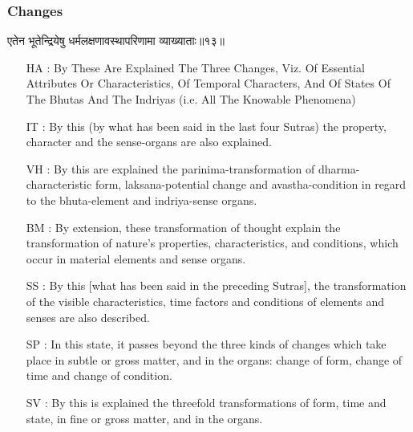 \begin{frame}[fragile]\frametitle{Changes}
\begin{sanskrit}
एतेन भूतेन्द्रियेषु धर्मलक्षणावस्थापरिणामा व्याख्याताः॥१३॥
\end{sanskrit}

	\begin{itemize}
	\item [HA]: By These Are Explained The Three Changes, Viz. Of Essential Attributes Or Characteristics, Of Temporal Characters, And Of States Of The Bhutas And The Indriyas (i.e. All The Knowable Phenomena)
	\item [IT]: By this (by what has been said in the last four Sutras) the property, character and the sense-organs are also explained.
	\item [VH]: By this are explained the parinima-transformation of dharma-characteristic form, laksana-potential change and avastha-condition in regard to the bhuta-element and indriya-sense organs.
	\item [BM]: By extension, these transformation of thought explain the transformation of nature’s properties, characteristics, and conditions, which occur in material elements and sense organs.
	\item [SS]: By this [what has been said in the preceding Sutras], the transformation of the visible characteristics, time factors and conditions of elements and senses are also described.
	\item [SP]: In this state, it passes beyond the three kinds of changes which take place in subtle or gross matter, and in the organs: change of form, change of time and change of condition.
	\item [SV]: By this is explained the threefold transformations of form, time and state, in fine or gross matter, and in the organs. 
	\end{itemize}
\end{frame}

